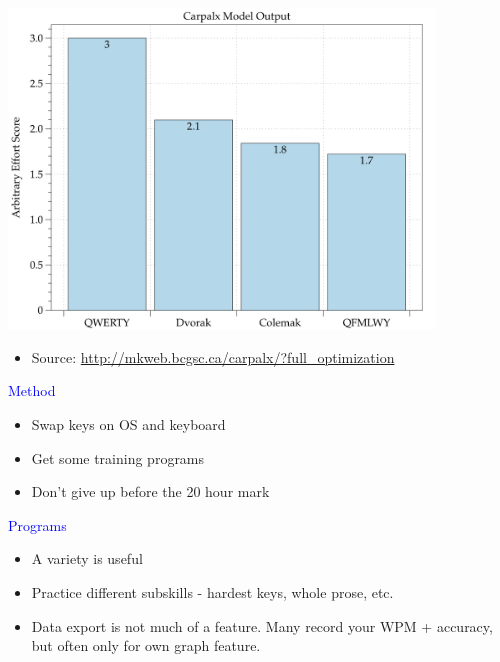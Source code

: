 \documentclass[landscape]{slides}
\begin{document}
\begin{slide}

    \centering

    \includegraphics[width=0.85\textwidth]{keyboards-qfmlwy}

    \begin{itemize}
        \item Source: \url{http://mkweb.bcgsc.ca/carpalx/?full_optimization}
    \end{itemize}

\end{slide}


\begin{slide}

    \textcolor{blue}{\Large{Method}}

    \begin{itemize}
        \item Swap keys on OS and keyboard
        \item Get some training programs
        \item Don't give up before the 20 hour mark
    \end{itemize}

\end{slide}


\begin{slide}

    \textcolor{blue}{\Large{Programs}}

    \begin{itemize}
        \item A variety is useful
        \item Practice different subskills - hardest keys, whole prose, etc.
        \item Data export is not much of a feature. Many record your WPM + accuracy, but often only for own graph feature.
    \end{itemize}

\end{slide}
\end{document}

